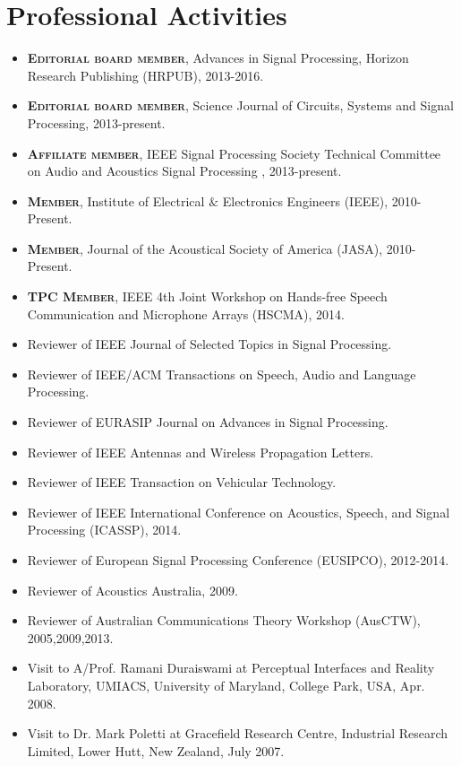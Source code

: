 \documentclass[11pt]{article}
\begin{document}
\section*{Professional Activities}
%
\begin{itemize}
%
\item \textsc{\textbf{Editorial board member}}, Advances in Signal Processing, Horizon Research Publishing (HRPUB), 2013-2016.
\item \textsc{\textbf{Editorial board member}}, Science Journal of Circuits, Systems and Signal Processing, 2013-present.
\item \textsc{\textbf{Affiliate member}}, IEEE Signal Processing Society Technical Committee on Audio and Acoustics Signal Processing , 2013-present.
\item \textsc{\textbf{Member}}, Institute of Electrical $\&$ Electronics Engineers (IEEE), 2010-Present.
\item \textsc{\textbf{Member}}, Journal of the Acoustical Society of America (JASA), 2010-Present.
\item \textsc{\textbf{TPC Member}}, IEEE 4th Joint Workshop on Hands-free Speech Communication and Microphone Arrays (HSCMA), 2014.
\item Reviewer of IEEE Journal of Selected Topics in Signal Processing.
\item Reviewer of IEEE/ACM Transactions on Speech, Audio and Language Processing.
\item Reviewer of EURASIP Journal on Advances in Signal Processing.
\item Reviewer of IEEE Antennas and Wireless Propagation Letters.
\item Reviewer of IEEE Transaction on Vehicular Technology.

\item Reviewer of IEEE International Conference on Acoustics, Speech, and Signal Processing (ICASSP), 2014.
\item Reviewer of European Signal Processing Conference (EUSIPCO), 2012-2014.
\item Reviewer of Acoustics Australia, 2009.
\item Reviewer of Australian Communications Theory Workshop (AusCTW), 2005,2009,2013.
\item Visit to A/Prof. Ramani Duraiswami at Perceptual Interfaces and Reality Laboratory, UMIACS,
University of Maryland, College Park, USA, Apr. 2008.
\item Visit to Dr. Mark Poletti at Gracefield Research Centre, Industrial Research Limited, Lower Hutt, New
Zealand, July 2007.
\end{itemize}
\end{document}
